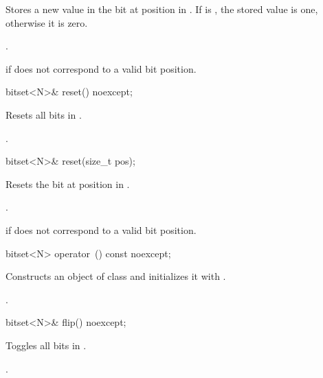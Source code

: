 \begin{itemdescr}
\pnum
\effects
Stores a new value in the bit at position  in
.
If  is , the stored value is one, otherwise it is zero.

\pnum
\returns
{}.

\pnum
\throws
{}%
 if  does not correspond to a valid bit position.
\end{itemdescr}

%
\begin{itemdecl}
bitset<N>& reset() noexcept;
\end{itemdecl}

\begin{itemdescr}
\pnum
\effects
Resets all bits in
.

\pnum
\returns
{}.
\end{itemdescr}

%
\begin{itemdecl}
bitset<N>& reset(size_t pos);
\end{itemdecl}

\begin{itemdescr}
\pnum
\effects
Resets the bit at position  in
.

\pnum
\returns
{}.

\pnum
\throws
{}%
 if  does not correspond to a valid bit position.
\end{itemdescr}

%
\begin{itemdecl}
bitset<N> operator~() const noexcept;
\end{itemdecl}

\begin{itemdescr}
\pnum
\effects
Constructs an object  of class
and initializes it with
.

\pnum
\returns
{}.
\end{itemdescr}

%
\begin{itemdecl}
bitset<N>& flip() noexcept;
\end{itemdecl}

\begin{itemdescr}
\pnum
\effects
Toggles all bits in
.

\pnum
\returns
{}.
\end{itemdescr}

